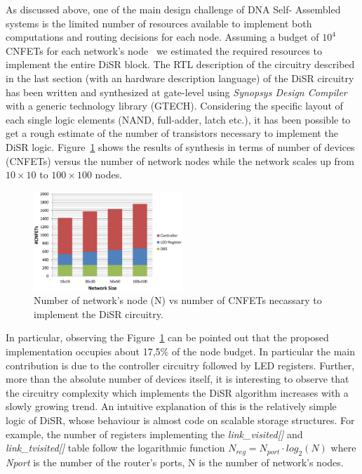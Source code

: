 As discussed above, one of the main design challenge of DNA Self-
Assembled systems is the limited number of resources available to implement both
computations and routing decisions for each node. Assuming a budget of
$10^4$ CNFETs for each network's node~\cite{liu_jetcs}  we estimated
the required resources to implement the entire DiSR block. The RTL
description of the circuitry described in the last section (with an
hardware description language)  of the DiSR circuitry has been written
and synthesized at gate-level using \emph{Synopsys Design Compiler} with 
a generic technology library (GTECH).
Considering the specific layout of each single logic elements  (NAND,
full-adder, latch etc.), it has been possible to get a rough estimate
of the number of transistors necessary to implement the DiSR logic.
Figure~\ref{fig:synthesys} shows the results of synthesis in terms of
number of devices (CNFETs) versus the number of network nodes while
the network scales up from $10\times10$ to $100\times100$ nodes.

\begin{figure}
  \centering
  \includegraphics[width=0.50\textwidth]{pictures/synthesis.eps}
  \caption{Number of network's node (N) vs number of CNFETs necassary to implement
  the DiSR circuitry.}
 \label{fig:synthesys}
\end{figure}

In particular, observing the Figure~\ref{fig:synthesys} can  be
pointed out that the proposed implementation occupies about 17,5\% of
the node budget. In particular the main contribution is due to the
controller circuitry followed by LED registers. Further, more than the
absolute number of devices itself, it is interesting to observe that
the circuitry complexity which implements the DiSR algorithm increases
with a slowly growing trend.   An intuitive explanation of this is the
relatively simple logic of DiSR, whose behaviour is almost code on
scalable storage structures. For example, the number of registers
implementing the \emph{link\_visited[]} and \emph{link\_tvisited[]}
table follow the logarithmic function $N_{reg}=N_{port} \cdot
log_2(N)$ where \emph{Nport} is the number of the router’s ports, N is
the number of network’s nodes.

